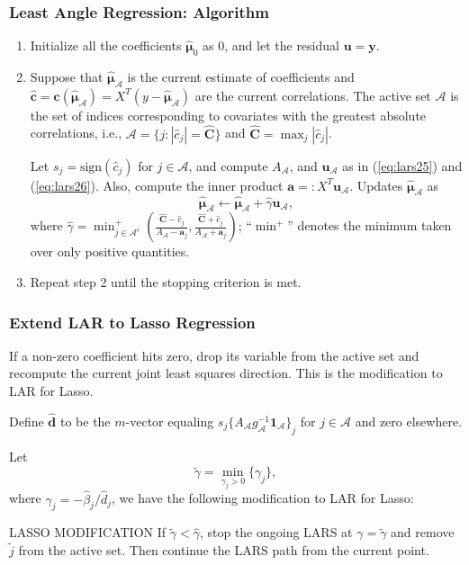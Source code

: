 \begin{frame}
\frametitle{Least Angle Regression: Algorithm}
\begin{enumerate}
    \item Initialize all the coefficients $\hat{\mathbf{\mu}}_0$ as 0, and let the residual $\mathbf{u}=\mathbf{y}$.
    \item Suppose that $\hat{\mathbf{\mu}}_\mathcal{A}$ is the current estimate of coefficients and $\hat{\mathbf{c}}=\mathbf{c}(\hat{\mathbf{\mu}}_\mathcal{A})=X^T(y-\hat{\mathbf{\mu}}_\mathcal{A})$ are the current correlations. The active set $\mathcal{A}$ is the set of indices corresponding to covariates with the greatest absolute correlations, i.e., $\mathcal{A}=\{j:|\hat{c}_j|=\hat{\mathbf{C}}\}$ and $\hat{\mathbf{C}}=\max_{j}|\hat{c}_j|$.
    
    Let $s_j=\text{sign}(\hat{c}_j)$ for $j\in\mathcal{A}$, and compute $A_\mathcal{A}$, and $\mathbf{u}_\mathcal{A}$ as in (\ref{eq:lars25}) and (\ref{eq:lars26}). Also, compute the inner product $\mathbf{a}=:X^T\mathbf{u}_\mathcal{A}$. Updates $\hat{\mathbf{\mu}}_\mathcal{A}$ as
    \begin{equation}\label{eq:lars212}
        \hat{\mathbf{\mu}}_\mathcal{A}\leftarrow\hat{\mathbf{\mu}}_\mathcal{A}+\hat{\gamma}\mathbf{u}_\mathcal{A},
    \end{equation}
    where $\hat{\gamma}=\min_{j\in\mathcal{A}^c}^+\left(\frac{\hat{\mathbf{C}}-\hat{c}_j}{A_\mathcal{A}-\mathbf{a}_j}, \frac{\hat{\mathbf{C}}+\hat{c}_j}{A_\mathcal{A}+\mathbf{a}_j}\right)$; ``$\min^+$'' denotes the minimum taken over only positive quantities.
    \item Repeat step 2 until the stopping criterion is met.
\end{enumerate}
    
\end{frame}

\begin{frame}
\frametitle{Extend LAR to Lasso Regression}
If a non-zero coefficient hits zero, drop its variable from the active set and recompute the current joint least squares direction. This is the modification to LAR for Lasso.

Define $\hat{\mathbf{d}}$ to be the $m$-vector equaling $s_j{ \{A_\mathcal{A} g^{-1}_\mathcal{A} \mathbf{1}_\mathcal{A}\}}_j$ for $j\in\mathcal{A}$ and zero elsewhere. 

Let $$\tilde{\gamma}=\min_{\gamma_j>0}\{\gamma_j\},$$ where $\gamma_j=-\hat{\beta}_j/\hat{d}_j$, we have the following modification to LAR for Lasso:

\begin{block}{LASSO MODIFICATION}
If $\tilde{\gamma}<\hat{\gamma}$, stop the ongoing LARS at $\gamma=\tilde{\gamma}$ and remove $\tilde{j}$ from the active set. Then continue the LARS path from the current point.
\end{block}
\end{frame}

